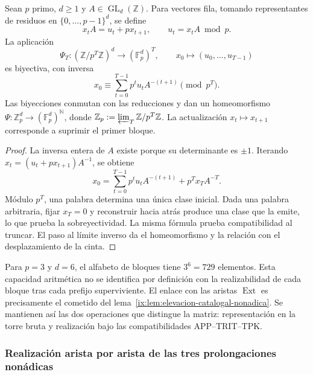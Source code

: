 \begin{proposition}
\label{ix:prop:ch-hensel-bruto}
Sean \(p\) primo, \(d\geq1\) y \(A\in\operatorname{GL}_d(\mathbb Z)\).
Para vectores fila, tomando representantes de residuos en
\(\{0,\ldots,p-1\}^d\), se define
\[
 x_tA=u_t+px_{t+1},\qquad u_t=x_tA\bmod p.
\]
La aplicación
\[
 \Psi_T:(\mathbb Z/p^T\mathbb Z)^d\longrightarrow
             (\mathbb F_p^d)^T,\qquad
 x_0\longmapsto(u_0,\ldots,u_{T-1})
\]
es biyectiva, con inversa
\[
 x_0\equiv\sum_{t=0}^{T-1}p^tu_tA^{-(t+1)}\pmod{p^T}.
\]
Las biyecciones conmutan con las reducciones y dan un homeomorfismo
\(\Psi:\mathbb Z_p^d\to(\mathbb F_p^d)^{\mathbb N}\), donde
\(\mathbb Z_p:=\varprojlim_T\mathbb Z/p^T\mathbb Z\). La actualización
\(x_t\mapsto x_{t+1}\) corresponde a suprimir el primer bloque.
\end{proposition}

\begin{proof}
La inversa entera de \(A\) existe porque su determinante es \(\pm1\).
Iterando \(x_t=(u_t+px_{t+1})A^{-1}\), se obtiene
\[
 x_0=\sum_{t=0}^{T-1}p^tu_tA^{-(t+1)}+p^Tx_TA^{-T}.
\]
Módulo \(p^T\), una palabra determina una única clase inicial. Dada una
palabra arbitraria, fijar \(x_T=0\) y reconstruir hacia atrás produce una
clase que la emite, lo que prueba la sobreyectividad. La misma fórmula
prueba compatibilidad al truncar. El paso al límite inverso da el
homeomorfismo y la relación con el desplazamiento de la cinta.
\end{proof}

Para \(p=3\) y \(d=6\), el alfabeto de bloques tiene \(3^6=729\)
elementos. Esta capacidad aritmética no se identifica por definición con
la realizabilidad de cada bloque tras cada prefijo superviviente. El
enlace con las aristas \(\operatorname{Ext}\) es precisamente el cometido
del lema~\ref{ix:lem:elevacion-catalogal-nonadica}. Se mantienen así las dos
operaciones que distingue la matriz: representación en la torre bruta y
realización bajo las compatibilidades APP--TRIT--TPK.




\subsubsection{Realización arista por arista de las tres prolongaciones nonádicas}
\label{ix:subsubsec:tres-vueltas-ext-ch}

